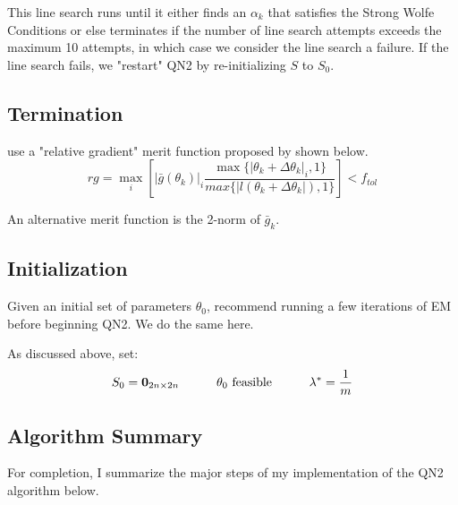 \documentclass[letter,12pt]{article}
\begin{document}
This line search runs until it either finds an $\alpha_k$ that satisfies the Strong Wolfe Conditions or else terminates if the number of line search attempts exceeds the maximum 10 attempts, in which case we consider the line search a failure.  If the line search fails, we "restart" QN2 by re-initializing $S$ to $S_0$.

\subsection{Termination}

\cite{jamshidianj97} use a "relative gradient" merit function proposed by \cite{khalfan93} shown below.
\begin{equation} \label{eq:rg}
rg = \max_i
\left[
|\bar{g}(\theta_k)|_i
\frac
{\max\{|\theta_k + \Delta \theta_k|_i,1\}}
{max\{|l(\theta_k + \Delta \theta_k|),1\}}
\right]
< f_{tol}
\end{equation}

An alternative merit function is the 2-norm of $\bar{g}_k$.

\subsection{Initialization}

Given an initial set of parameters $\theta_0$, \cite{jamshidianj93} recommend running a few iterations of EM before beginning QN2.  We do the same here.

As discussed above, set:
\[
S_0 = \boldsymbol{0}_{2n \times 2n}
\indent \indent
\theta_0 \text{ feasible}
\indent \indent
\lambda^* = \frac{1}{m}
\]

\subsection{Algorithm Summary}

For completion, I summarize the major steps of my implementation of the QN2 algorithm below.
\end{document}
